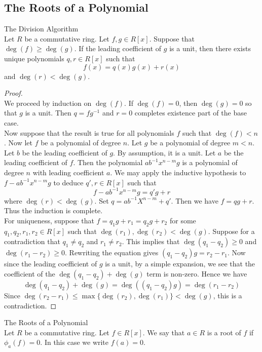 \documentclass[a4paper]{article}
\begin{document}
\subsection{The Roots of a Polynomial}
\begin{thm}{The Division Algorithm}{}\\
Let $R$ be a commutative ring. Let $f,g\in R[x]$. Suppose that $\deg(f)\geq\deg(g)$. If the leading coefficient of $g$ is a unit, then there exists unique polynomials $q,r\in R[x]$ such that $$f(x)=q(x)g(x)+r(x)$$ and $\deg(r)<\deg(g)$. 
\begin{proof}\\
We proceed by induction on $\deg(f)$. If $\deg(f)=0$, then $\deg(g)=0$ so that $g$ is a unit. Then $q=fg^{-1}$ and $r=0$ completes existence part of the base case. \\

Now suppose that the result is true for all polynomials $f$ such that $\deg(f)<n$. Now let $f$ be a polynomial of degree $n$. Let $g$ be a polynomial of degree $m<n$. Let $b$ be the leading coefficient of $g$. By assumption, it is a unit. Let $a$ be the leading coefficient of $f$. Then the polynomial $ab^{-1}x^{n-m}g$ is a polynomial of degree $n$ with leading coefficient $a$. We may apply the inductive hypothesis to $f-ab^{-1}x^{n-m}g$ to deduce $q',r\in R[x]$ such that $$f-ab^{-1}x^{n-m}g=q'g+r$$ where $\deg(r)<\deg(g)$. Set $q=ab^{-1}X^{n-m}+q'$. Then we have  $f=qg+r$. Thus the induction is complete. \\

For uniqueness, suppose that $f=q_1g+r_1=q_2g+r_2$ for some $q_1,q_2,r_1,r_2\in R[x]$ such that $\deg(r_1),\deg(r_2)<\deg(g)$. Suppose for a contradiction that $q_1\neq q_2$ and $r_1\neq r_2$. This implies that $\deg(q_1-q_2)\geq 0$ and $\deg(r_1-r_2)\geq 0$. Rewriting the equation gives $(q_1-q_2)g=r_2-r_1$. Now since the leading coefficient of $g$ is a unit, by a simple expansion, we see that the coefficient of the $\deg(q_1-q_2)+\deg(g)$ term is non-zero. Hence we have $$\deg(q_1-q_2)+\deg(g)=\deg((q_1-q_2)g)=\deg(r_1-r_2)$$ Since $\deg(r_2-r_1)\leq\max\{\deg(r_2),\deg(r_1)\}<\deg(g)$, this is a contradiction. 
\end{proof}
\end{thm}

\begin{defn}{The Roots of a Polynomial}{}\\
Let $R$ be a commutative ring. Let $f\in R[x]$. We say that $a\in R$ is a root of $f$ if $\phi_a(f)=0$. In this case we write $f(a)=0$. 
\end{defn}
\end{document}
